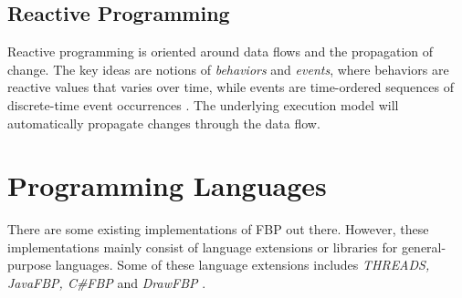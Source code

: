 \subsection{Reactive Programming}
Reactive programming is oriented around data flows and the propagation
of change. The key ideas are notions of \emph{behaviors} and
\emph{events}, where behaviors are reactive values that varies over
time, while events are time-ordered sequences of discrete-time event
occurrences \citep{wan:2000}. The underlying execution model will
automatically propagate changes through the data flow.


\section{Programming Languages}
There are some existing implementations of FBP out there. However,
these implementations mainly consist of language extensions or
libraries for general-purpose languages. Some of these language
extensions includes \emph{THREADS, JavaFBP, C\#FBP} and
\emph{DrawFBP} \citep{morrison:2010}.

